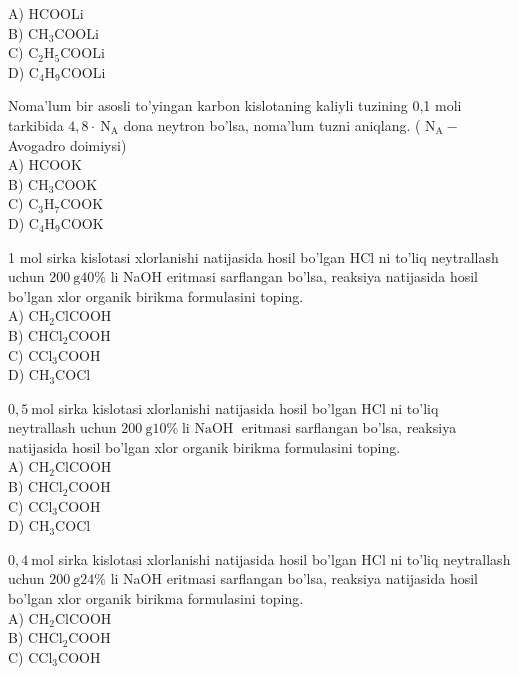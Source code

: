 A) HCOOLi\\
B) $\mathrm{CH}_{3} \mathrm{COOLi}$\\
C) $\mathrm{C}_{2} \mathrm{H}_{5} \mathrm{COOLi}$\\
D) $\mathrm{C}_{4} \mathrm{H}_{9} \mathrm{COOLi}$
  \item Noma'lum bir asosli to'yingan karbon kislotaning kaliyli tuzining 0,1 moli tarkibida $4,8 \cdot \mathrm{~N}_{\mathrm{A}}$ dona neytron bo'lsa, noma'lum tuzni aniqlang. ( $\mathrm{N}_{\mathrm{A}}-$ Avogadro doimiysi)\\
A) HCOOK\\
B) $\mathrm{CH}_{3} \mathrm{COOK}$\\
C) $\mathrm{C}_{3} \mathrm{H}_{7} \mathrm{COOK}$\\
D) $\mathrm{C}_{4} \mathrm{H}_{9} \mathrm{COOK}$
  \item 1 mol sirka kislotasi xlorlanishi natijasida hosil bo'lgan HCl ni to'liq neytrallash uchun $200 \mathrm{~g} 40 \%$ li NaOH eritmasi sarflangan bo'lsa, reaksiya natijasida hosil bo'lgan xlor organik birikma formulasini toping.\\
A) $\mathrm{CH}_{2} \mathrm{ClCOOH}$\\
B) $\mathrm{CHCl}_{2} \mathrm{COOH}$\\
C) $\mathrm{CCl}_{3} \mathrm{COOH}$\\
D) $\mathrm{CH}_{3} \mathrm{COCl}$
  \item $0,5 \mathrm{~mol}$ sirka kislotasi xlorlanishi natijasida hosil bo'lgan HCl ni to'liq\\
neytrallash uchun $200 \mathrm{~g} 10 \% \operatorname{li~NaOH}$ eritmasi sarflangan bo'lsa, reaksiya natijasida hosil bo'lgan xlor organik birikma formulasini toping.\\
A) $\mathrm{CH}_{2} \mathrm{ClCOOH}$\\
B) $\mathrm{CHCl}_{2} \mathrm{COOH}$\\
C) $\mathrm{CCl}_{3} \mathrm{COOH}$\\
D) $\mathrm{CH}_{3} \mathrm{COCl}$
  \item $0,4 \mathrm{~mol}$ sirka kislotasi xlorlanishi natijasida hosil bo'lgan HCl ni to'liq neytrallash uchun $200 \mathrm{~g} 24 \%$ li NaOH eritmasi sarflangan bo'lsa, reaksiya natijasida hosil bo'lgan xlor organik birikma formulasini toping.\\
A) $\mathrm{CH}_{2} \mathrm{ClCOOH}$\\
B) $\mathrm{CHCl}_{2} \mathrm{COOH}$\\
C) $\mathrm{CCl}_{3} \mathrm{COOH}$\\
